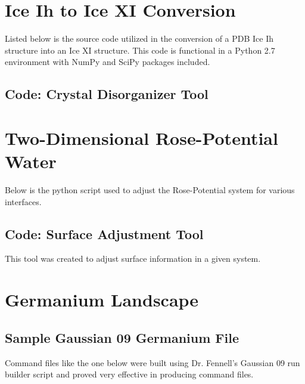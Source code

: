 \chapter{Ice Ih to Ice XI Conversion}
\label{ch:App:CrystalDisorg}

Listed below is the source code utilized in the conversion of a PDB Ice Ih structure into an Ice XI structure. This code is functional in a Python 2.7 environment with NumPy and SciPy packages included.

\section{Code: Crystal Disorganizer Tool}



\chapter{Two-Dimensional Rose-Potential Water}
\label{ch:App:2DWater}

Below is the python script used to adjust the Rose-Potential system for various interfaces.

\section{Code: Surface Adjustment Tool}
This tool was created to adjust surface information in a given system.


% 


\chapter{Germanium Landscape}
\label{ch:App:Germane}

\section{Sample Gaussian 09 Germanium File}
\label{SampleGeRunFile}
Command files like the one below were built using Dr. Fennell's Gaussian 09 run builder script and proved very effective in producing command files.


